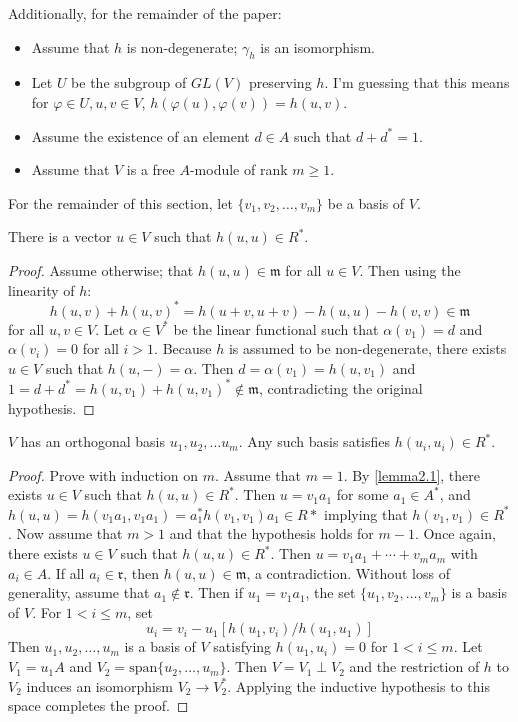 
Additionally, for the remainder of the paper:

\begin{itemize}
\item Assume that $h$ is non-degenerate; $\gamma_h$ is an isomorphism.
\item Let $U$ be the subgroup of $GL(V)$ preserving $h$. I'm guessing that this means for $\varphi \in U, u,v \in V$, $h(\varphi(u), \varphi(v)) = h(u,v)$.
\item Assume the existence of an element $d \in A$ such that $d + d^* = 1$.
\item Assume that $V$ is a free $A$-module of rank $m \ge 1$.
\end{itemize}
For the remainder of this section, let $\{v_1, v_2, \dotsc, v_m\}$ be a basis of $V$.

\begin{lemma}\label{lemma2.1}
There is a vector $u \in V$ such that $h(u,u) \in R^*$.
\end{lemma}
\begin{proof}
Assume otherwise; that  $h(u,u) \in \mathfrak{m}$ for all $u \in V$.
Then using the linearity of $h$:
\[
h(u,v) + h(u,v)^* = h(u+v, u+v) - h(u,u) - h(v,v) \in \mathfrak{m}
\]
for all $u,v \in V$.
Let $\alpha \in V^*$ be the linear functional such that $\alpha(v_1) = d$ and $\alpha(v_i) = 0$ for all $i > 1$.
Because $h$ is assumed to be non-degenerate, there exists $u \in V$ such that $h(u,-) = \alpha$.
Then $d = \alpha(v_1) = h(u,v_1)$ and $1 = d + d^* = h(u,v_1) + h(u,v_1)^* \not\in \mathfrak{m}$, contradicting the original hypothesis.
\end{proof}

\begin{lemma}\label{lemma2.2}
$V$ has an orthogonal basis $u_1, u_2, \dotsc u_m$.
Any such basis satisfies $h(u_i, u_i) \in R^*$.
\end{lemma}
\begin{proof}
Prove with induction on $m$.
Assume that $m = 1$.
By \cref{lemma2.1}, there exists $u \in V$ such that $h(u,u) \in R^*$.
Then $u = v_1a_1$ for some $a_1 \in A^*$, and $h(u,u) = h(v_1a_1, v_1a_1) = a_1^*h(v_1,v_1)a_1 \in R*$ implying that $h(v_1, v_1) \in R^*$.
Now assume that $m > 1$ and that the hypothesis holds for $m - 1$.
Once again, there exists $u \in V$ such that $h(u,u) \in R^*$.
Then $u = v_1a_1 + \dotsb + v_m a_m$ with $a_i \in A$.
If all $a_i \in \mathfrak{r}$, then $h(u,u) \in \mathfrak{m}$, a contradiction.
Without loss of generality, assume that $a_1 \not\in \mathfrak{r}$.
Then if $u_1 = v_1 a_1$, the set $\{u_1, v_2, \dotsc, v_m\}$ is a basis of $V$.
For $1 < i \le m$, set
\[
u_i = v_i - u_1[h(u_1,v_i)/h(u_1, u_1)]
\]
Then $u_1, u_2, \dotsc, u_m$ is a basis of $V$ satisfying $h(u_1, u_i) = 0$ for $1 < i \le m$.
Let $V_1 = u_1 A$ and $V_2 = \text{span} \{u_2, \dotsc, u_m\}$.
Then $V = V_1 \perp V_2$ and the restriction of $h$ to $V_2$ induces an isomorphism $V_2 \to V_2^*$.
Applying the inductive hypothesis to this space completes the proof.
\end{proof}

